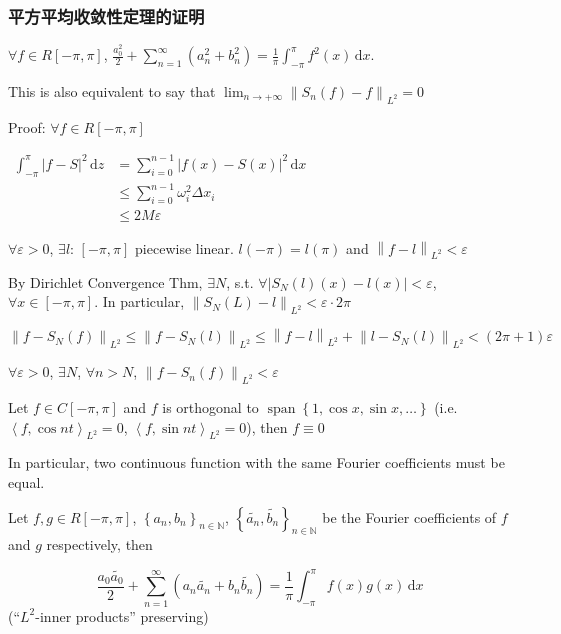 \subsubsection{平方平均收敛性定理的证明}

\begin{theorem}
    $\forall f\in R[-\pi,\pi]$, $\frac{a_0^2}{2}+\sum_{n=1}^{\infty}\left(a_n^2+b_n^2\right)=\frac{1}{\pi}\int_{-\pi}^{\pi}f^2(x)\,\mathrm{d}x$.

    This is also equivalent to say that $\lim_{n\to+\infty}\left\|S_n(f)-f\right\|_{L^2}=0$
\end{theorem}

Proof: $\forall f\in R[-\pi,\pi]$

$\begin{aligned}
        \int_{-\pi}^{\pi}|f-S|^2\,\mathrm{d}z & =\sum_{i=0}^{n-1}|f(x)-S(x)|^2\,\mathrm{d}x \\
                                              & \leq\sum_{i=0}^{n-1}\omega_i^2\Delta x_i    \\
                                              & \leq 2M\varepsilon
    \end{aligned}$

$\forall \varepsilon>0$, $\exists l:\,[-\pi,\pi]$ piecewise linear. $l(-\pi)=l(\pi)$ and $\left\|f-l\right\|_{L^2}<\varepsilon$

By Dirichlet Convergence Thm, $\exists N$, s.t. $\forall\left|S_N(l)(x)-l(x)\right|<\varepsilon$, $\forall x\in[-\pi,\pi]$. In particular, $\left\|S_N(L)-l\right\|_{L^2}<\varepsilon\cdot 2\pi$

$$\left\|f-S_N(f)\right\|_{L^2}\leq\left\|f-S_N(l)\right\|_{L^2}\leq\left\|f-l\right\|_{L^2}+\left\|l-S_N(l)\right\|_{L^2}<(2\pi+1)\varepsilon$$

$\forall\varepsilon>0$, $\exists N$, $\forall n>N$, $\left\|f-S_n(f)\right\|_{L^2}<\varepsilon$

\begin{corollary}
    Let $f\in C[-\pi,\pi]$ and $f$ is orthogonal to $\operatorname{span}\left\{1,\cos x,\sin x,\dots\right\}$ (i.e. $\left<f,\cos nt\right>_{L^2}=0$, $\left<f,\sin nt\right>_{L^2}=0$), then $f\equiv 0$

    In particular, two continuous function with the same Fourier coefficients must be equal.
\end{corollary}

\begin{corollary}
    Let $f,g\in R[-\pi,\pi]$, $\left\{a_n,b_n\right\}_{n\in\mathbb{N}}$, $\left\{\tilde{a_n},\tilde{b_n}\right\}_{n\in\mathbb{N}}$ be the Fourier coefficients of $f$ and $g$ respectively, then

    $$\frac{a_0\tilde{a_0}}{2}+\sum_{n=1}^{\infty}\left(a_n\tilde{a_n}+b_n\tilde{b_n}\right)=\frac{1}{\pi}\int_{-\pi}^{\pi}f(x)g(x)\,\mathrm{d}x$$
    (``$L^2$-inner products'' preserving)
\end{corollary}

